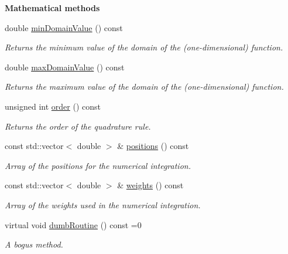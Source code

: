 \begin{Indent}{\bf Mathematical methods}\par
\begin{DoxyCompactItemize}
\item 
double \hyperlink{class_q_u_e_s_o_1_1_base1_d_quadrature_a938187458b0069e7b3779bc3739a1cc0}{min\-Domain\-Value} () const 
\begin{DoxyCompactList}\small\item\em Returns the minimum value of the domain of the (one-\/dimensional) function. \end{DoxyCompactList}\item 
double \hyperlink{class_q_u_e_s_o_1_1_base1_d_quadrature_af3d09abe6716a23f9061b8b657524547}{max\-Domain\-Value} () const 
\begin{DoxyCompactList}\small\item\em Returns the maximum value of the domain of the (one-\/dimensional) function. \end{DoxyCompactList}\item 
unsigned int \hyperlink{class_q_u_e_s_o_1_1_base1_d_quadrature_a07713b5e8df24bbc8e3e9d13b707e5d0}{order} () const 
\begin{DoxyCompactList}\small\item\em Returns the order of the quadrature rule. \end{DoxyCompactList}\item 
const std\-::vector$<$ double $>$ \& \hyperlink{class_q_u_e_s_o_1_1_base1_d_quadrature_a9f5d9b6e20b5105e2c17b7da1b71c259}{positions} () const 
\begin{DoxyCompactList}\small\item\em Array of the positions for the numerical integration. \end{DoxyCompactList}\item 
const std\-::vector$<$ double $>$ \& \hyperlink{class_q_u_e_s_o_1_1_base1_d_quadrature_a5780ce2b5ef26ce0f5183e8e32358cee}{weights} () const 
\begin{DoxyCompactList}\small\item\em Array of the weights used in the numerical integration. \end{DoxyCompactList}\item 
virtual void \hyperlink{class_q_u_e_s_o_1_1_base1_d_quadrature_a37bdd63ba8b986e02d47b05fc8795332}{dumb\-Routine} () const =0
\begin{DoxyCompactList}\small\item\em A bogus method. \end{DoxyCompactList}\end{DoxyCompactItemize}
\end{Indent}
